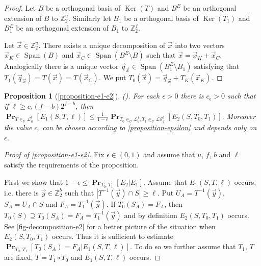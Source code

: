 \documentclass[unicode,review]{siamart1116}
\newcommand{\vecspace}[2]{\mathbb{Z}_{#1}^{#2}}
\newcommand{\binvecspace}[1]{\vecspace{2}{#1}}
\newcommand{\linearmaps}[2]{\mathcal{L}_{#1}^{#2}}
\newcommand{\surjectivelinearmaps}[2]{\mathcal{LS}_{#1}^{#2}}
\newcommand{\probs}[2]{\operatorname{\mathbf{Pr}}_{{#1}}\left[{#2}\right]}
\newtheorem*{propositionrep*}{Proposition}
\numberwithin{theorem}{section}
\begin{document}
\begin{appendix}
\begin{proof}
Let $B$ be a orthogonal basis of $\operatorname{Ker}(T)$ and $B^E$ be an orthogonal extension of $B$ to $\binvecspace{u}$.
Similarly let $B_1$ be a orthogonal basis of $\operatorname{Ker}(T_1)$ and $B_1^E$ be an orthogonal extension of $B_1$ to $\binvecspace{f}$.

Let $\vec{x} \in \binvecspace{u}$.
There exists a unique decomposition of $\vec{x}$ into two vectors $\vec{x}_K \in \operatorname{Span}(B)$ and $\vec{x}_C \in \operatorname{Span}(B^E \setminus B)$ such that $\vec{x} = \vec{x}_K + \vec{x}_C$.
Analogically there is a unique vector $\vec{q}_{\vec{x}} \in \operatorname{Span}(B_1^E \setminus B_1)$ satisfying that $T_1(\vec{q}_{\vec{x}}) = T(\vec{x}) = T(\vec{x}_C)$.
We put $T_0(\vec{x}) = \vec{q}_{\vec{x}} + T_K(\vec{x}_K)$.
\end{proof}

\begin{propositionrep*}[\cref{proposition-e1-e2}] \emph{({\cite[Proposition 3.2, p.~11]{alonetal}}).}
For each $\epsilon > 0$ there is $c_\epsilon > 0$ such that if $\ell \geq c_\epsilon (f - b)2^{f-b}$, then
$
\probs{T \in_U \linearmaps{u}{b}}{E_1(S, T, \ell)} \leq \frac{1}{1 - \epsilon}\probs{T_0 \in_U \linearmaps{u}{f}, T_1 \in_U \surjectivelinearmaps{f}{b}}{E_2(S, T_0, T_1)}.
$
Moreover the value $c_\epsilon$ can be chosen according to \cref{proposition-epsilon} and depends only on $\epsilon$.
\end{propositionrep*}
\begin{proof}[Proof of \cref{proposition-e1-e2}]
Fix $\epsilon \in (0, 1)$ and assume that $u$, $f$, $b$ and $\ell$ satisfy the requirements of the proposition.

First we show that $1 - \epsilon \leq \probs{T_0, T_1}{E_2 | E_1}$.
Assume that $E_1(S, T, \ell)$ occurs, i.e. there is $\vec{y} \in \binvecspace{b}$ such that $|T^{-1}(\vec{y}) \cap S| \geq \ell$.
Put $U_A = T^{-1}(\vec{y})$, $S_A = U_A \cap S$ and $F_A = T_1^{-1}(\vec{y})$.
If $T_0(S_A) = F_A$, then $T_0(S) \supseteq T_0(S_A) = F_A = T_1^{-1}(\vec{y})$ and by definition $E_2(S, T_0, T_1)$ occurs.
See \cref{fig-decomposition-e2} for a better picture of the situation when $E_2(S, T_0, T_1)$ occurs.
Thus it is sufficient to estimate $\probs{T_0, T_1}{T_0(S_A) = F_A | E_1(S, T, \ell)}$.
To do so we further assume that $T_1$, $T$ are fixed, $T = T_1 \circ T_0$ and $E_1(S, T, \ell)$ occurs.


\end{proof}
\end{appendix}
\end{document}
